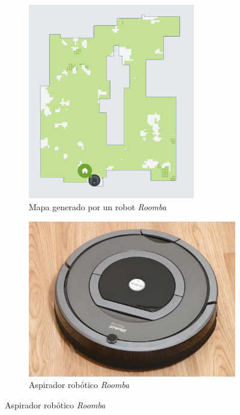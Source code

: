 \begin{itemize}
   \begin{figure}[H]
    \centering
        \begin{subfigure}{0.45\textwidth}           \includegraphics[width=0.8\textwidth]{img/roomba.png}
        \caption{Mapa generado por un robot \textit{Roomba}} \label{fig:roomba}        \label{fig:roombamapa}
        \end{subfigure}
        \begin{subfigure}{0.45\textwidth}
            \includegraphics[width=\textwidth]{img/roomba.jpg}
            \caption{Aspirador robótico \textit{Roomba}}
            \label{fig:roombarobot}
        \end{subfigure}
        \label{fig:roomba}
    \end{figure}


\end{itemize}
